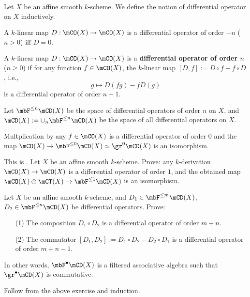 	\begin{defn}
		\label{defn-diff}
		Let $X$ be an affine smooth $k$-scheme. We define the notion of differential operator on $X$ inductively. 

		A $k$-linear map $D: \mCO(X) \to \mCO(X)$ is a differential operator of order $-n$ ($n>0$) iff $D=0$.

		A $k$-linear map $D: \mCO(X) \to \mCO(X)$ is a \textbf{differential operator of order $n$} ($n\ge 0$) if for any function $f\in \mCO(X)$, the $k$-linear map $[D,f]:=D\circ f- f\circ D$, i.e.,
		\[
			g \mapsto D(fg) - fD(g)
		\]
		is a differential operator of order $n-1$. 

		Let $\mbF^{\le n}\mCD(X)$ be the space of differential operators of order $n$ on $X$, and $\mCD(X):= \cup_n \mbF^{\le n}\mCD(X)$ be the space of all differential operators on $X$.
	\end{defn}

	\begin{exam}
		Multplication by any $f\in \mCO(X)$ is a differential operator of order $0$ and the map $\mCO(X) \to \mbF^{\le 0}\mCD(X) \simeq \gr^0 \mCD(X)$ is an isomorphism.
	\end{exam}

	\begin{exe}
		\label{exe-diff-2}
		This is . Let $X$ be an affine smooth $k$-scheme. Prove: any $k$-derivation $\mCO(X) \to \mCO(X)$ is a differential operator of order $1$, and the obtained map $\mCO(X) \oplus \mCT(X) \to \mbF^{\le 1} \mCD(X)$ is an isomorphism.
	\end{exe}



	\begin{lem}
		Let $X$ be an affine smooth $k$-scheme, and $D_1\in \mbF^{\le m}\mCD(X)$, $D_2\in \mbF^{\le n}\mCD(X)$ be differential operators. Prove:
		\begin{itemize}
			\item[(1)]
				The composition $D_1\circ D_2$ is a differential operator of order $m+n$.
			\item[(2)]
				The commutator $[D_1,D_2]:=D_1\circ D_2 - D_2 \circ D_1$ is a differential operator of order $m+n-1$.		
		\end{itemize}
		In other words, $\mbF^\bullet\mCD(X)$ is a filtered associative algebra such that $\gr^\bullet \mCD(X)$ is commutative.
	\end{lem}

	\proof
		Follow from the above exercise and induction.

